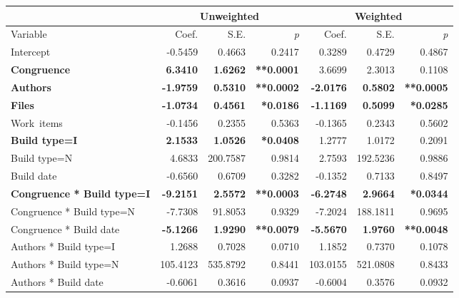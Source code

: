 \documentclass[12pt,oneside]{book}
\begin{document}
\begin{table}
\begin{center}
\begin{tabular}{l|rrr|rrr}
 & \multicolumn{3}{c|}{Unweighted} & \multicolumn{3}{c}{Weighted} \\\hline
Variable & Coef. & S.E. & \emph{p} & Coef. & S.E. & \emph{p} \\
	\hline
Intercept                   &  -0.5459 &   0.4663 & 0.2417 &    0.3289 &    0.4729 &   0.4867 \\
\textbf{Congruence}              &   \textbf{6.3410} &   \textbf{1.6262} & \textbf{**0.0001} &    3.6699 &    2.3013 &   0.1108 \\
\textbf{Authors}                     &  \textbf{-1.9759} &   \textbf{0.5310} & \textbf{**0.0002} &   \textbf{-2.0176} &    \textbf{0.5802} &   \textbf{**0.0005} \\
\textbf{Files}                       &  \textbf{-1.0734} &   \textbf{0.4561} & \textbf{*0.0186} &   \textbf{-1.1169} &    \textbf{0.5099} &   \textbf{*0.0285} \\
Work~items                   &  -0.1456 &   0.2355 & 0.5363 &   -0.1365 &    0.2343 &   0.5602 \\
\textbf{Build type=I}                      &   \textbf{2.1533} &   \textbf{1.0526} & \textbf{*0.0408} &    1.2777 &    1.0172 &   0.2091 \\
Build type=N                      &   4.6833 & 200.7587 & 0.9814 &    2.7593 &  192.5236 &   0.9886 \\
Build date                   &  -0.6560 &   0.6709 & 0.3282 &   -0.1352 &    0.7133 &   0.8497 \\
\textbf{Congruence * Build type=I}     &  \textbf{-9.2151} &   \textbf{2.5572} & \textbf{**0.0003} &   \textbf{-6.2748} &    \textbf{2.9664} &   \textbf{*0.0344} \\
Congruence * Build type=N     &  -7.7308 &  91.8053 & 0.9329 &   -7.2024 &  188.1811 &   0.9695 \\
Congruence * Build date  &  \textbf{-5.1266} &   \textbf{1.9290} & \textbf{**0.0079} &   \textbf{-5.5670} &    \textbf{1.9760} &   \textbf{**0.0048} \\
Authors * Build type=I            &   1.2688 &   0.7028 & 0.0710 &    1.1852 &    0.7370 &   0.1078 \\
Authors * Build type=N            & 105.4123 & 535.8792 & 0.8441 &  103.0155 &  521.0808 &   0.8433 \\
Authors * Build date         &  -0.6061 &   0.3616 & 0.0937 &   -0.6004 &    0.3576 &   0.0932 \\

\end{tabular}
\end{center}
\end{table}
\end{document}
